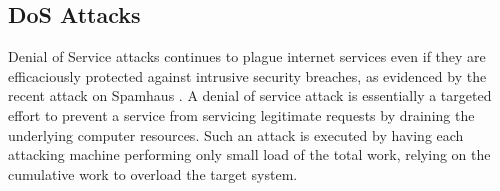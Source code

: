 \subsection{DoS Attacks}
\label{text:dos}
Denial of Service attacks continues to plague internet services even if they are efficaciously protected against intrusive security breaches, as evidenced by the recent attack on Spamhaus \cite{BBC}. A denial of service attack is essentially a targeted effort to prevent a service from servicing legitimate requests by draining the underlying computer resources. Such an attack is executed by having each attacking machine performing only small load of the total work, relying on the cumulative work to overload the target system. 




			

